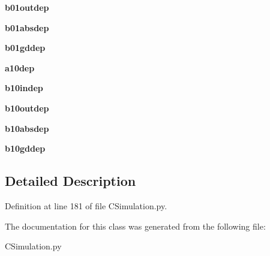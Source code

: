 \begin{DoxyCompactItemize}
\item 
\mbox{\label{class_c_simulation_1_1_simulation_1_1_no_m_a_s_s_models_1_1_windows_1_1_window_aca2f39dd8c1397594af0c22b6e7ece7d}} 
{\bfseries b01outdep}
\item 
\mbox{\label{class_c_simulation_1_1_simulation_1_1_no_m_a_s_s_models_1_1_windows_1_1_window_ac5cd5bd17a1a4e48bf8798a0c323cbeb}} 
{\bfseries b01absdep}
\item 
\mbox{\label{class_c_simulation_1_1_simulation_1_1_no_m_a_s_s_models_1_1_windows_1_1_window_a84b19835220078fb9984ac6a23f24e7d}} 
{\bfseries b01gddep}
\item 
\mbox{\label{class_c_simulation_1_1_simulation_1_1_no_m_a_s_s_models_1_1_windows_1_1_window_ae099fe8a024e5da10b2e342cd09af1c0}} 
{\bfseries a10dep}
\item 
\mbox{\label{class_c_simulation_1_1_simulation_1_1_no_m_a_s_s_models_1_1_windows_1_1_window_abca6023fb7ceb148aea6fcb50cf3f109}} 
{\bfseries b10indep}
\item 
\mbox{\label{class_c_simulation_1_1_simulation_1_1_no_m_a_s_s_models_1_1_windows_1_1_window_a3f998e3a8fa3e33f2d5f5641354649b6}} 
{\bfseries b10outdep}
\item 
\mbox{\label{class_c_simulation_1_1_simulation_1_1_no_m_a_s_s_models_1_1_windows_1_1_window_a9c7ecf10b72126795a971fc0699f733f}} 
{\bfseries b10absdep}
\item 
\mbox{\label{class_c_simulation_1_1_simulation_1_1_no_m_a_s_s_models_1_1_windows_1_1_window_a1617185c2f001e53c0f7ed8549394661}} 
{\bfseries b10gddep}
\end{DoxyCompactItemize}


\subsection{Detailed Description}


Definition at line 181 of file C\+Simulation.\+py.



The documentation for this class was generated from the following file\+:\begin{DoxyCompactItemize}
\item 
C\+Simulation.\+py\end{DoxyCompactItemize}
